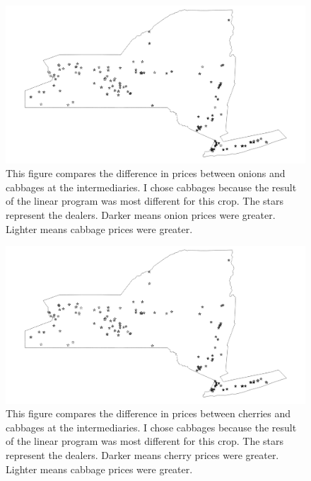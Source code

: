 \documentclass{report}
\begin{document}

\begin{figure}
\centering
\begin{framed}
\includegraphics[scale=.50]{procs_243_49}
\caption{This figure compares the difference in prices between onions and cabbages at the intermediaries. I chose cabbages because the result of the linear program was most different for this crop. The stars represent the dealers. Darker means onion prices were greater. Lighter means cabbage prices were greater.}
\label{fig:procs_243_49}
\end{framed}
\end{figure}

\begin{figure}
\centering
\begin{framed}
\includegraphics[scale=.50]{procs_243_66}
\caption{This figure compares the difference in prices between cherries and cabbages at the intermediaries. I chose cabbages because the result of the linear program was most different for this crop. The stars represent the dealers. Darker means cherry prices were greater. Lighter means cabbage prices were greater.}
\label{fig:procs_243_66}
\end{framed}
\end{figure}
\end{document}
